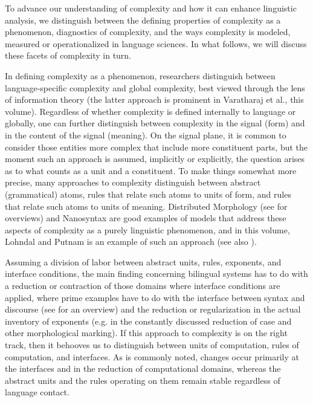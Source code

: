 \documentclass[output=paper,colorlinks,citecolor=brown]{langscibook}
\begin{document}
To advance our understanding of complexity and how it can enhance linguistic analysis, we distinguish between the defining properties of complexity as a phenomenon, diagnostics of complexity, and the ways complexity is modeled, measured or operationalized in language sciences. In what follows, we will discuss these facets of complexity in turn. 

In defining complexity as a phenomenon, researchers distinguish between language-specific complexity and global complexity, best viewed through the lens of information theory (the latter approach is prominent in Varatharaj et al., this volume). Regardless of whether complexity is defined internally to language or globally, one can further distinguish between complexity in the signal (form) and in the content of the signal (meaning). On the signal plane, it is common to consider those entities more complex that include more constituent parts, but the moment such an approach is assumed, implicitly or explicitly, the question arises as to what counts as a unit and a constituent. To make things somewhat more precise, many approaches to complexity distinguish between abstract (grammatical) atoms, rules that relate such atoms to units of form, and rules that relate such atoms to units of meaning. Distributed Morphology (see \citealt{HarleyNoyer1999,McGinnis-Archibald2016} for overviews) and Nanosyntax \citep{Caha2009} are good examples of models that address these aspects of complexity as a purely linguistic phenomenon, and in this volume, Lohndal and Putnam is an example of such an approach (see also \citealt{LohndalPutnam2021,lohnput24}).

Assuming a division of labor between abstract units, rules, exponents, and interface conditions, the main finding concerning bilingual systems has to do with a reduction or contraction of those domains where interface conditions are applied, where prime examples have to do with the interface between syntax and discourse (see \citealt{Laleko2021} for an overview) and the reduction or regularization in the actual inventory of exponents (e.g. in the constantly discussed reduction of case and other morphological marking). If this approach to complexity is on the right track, then it behooves us to distinguish between units of computation, rules of computation, and interfaces. As is commonly noted, changes occur primarily at the interfaces and in the reduction of computational domains, whereas the abstract units and the rules operating on them remain stable regardless of language contact.  
\end{document}
